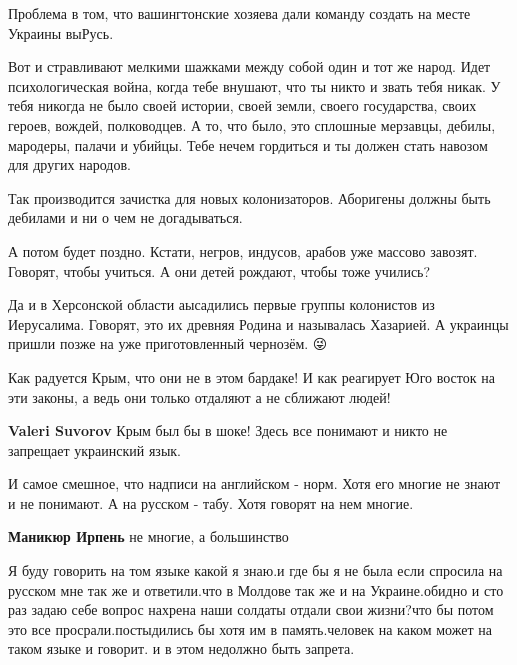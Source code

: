 \begin{itemize}
Проблема в том, что вашингтонские хозяева дали команду создать на месте Украины выРусь.

Вот и стравливают мелкими шажками между собой один и тот же народ. Идет
психологическая война, когда тебе внушают, что ты никто и звать тебя никак. У
тебя никогда не было своей истории, своей земли, своего государства, своих
героев, вождей, полководцев. А то, что было, это сплошные мерзавцы, дебилы,
мародеры, палачи и убийцы. Тебе нечем гордиться и ты должен стать навозом для
других народов.

Так производится зачистка для новых колонизаторов. Аборигены должны быть
дебилами и ни о чем не догадываться.

А потом будет поздно. Кстати, негров, индусов, арабов уже массово завозят.
Говорят, чтобы учиться. А они детей рождают, чтобы тоже учились?

Да и в Херсонской области аысадились первые группы колонистов из Иерусалима.
Говорят, это их древняя Родина и называлась Хазарией. А украинцы пришли позже
на уже приготовленный чернозём. 😜


Как радуется Крым, что они не в этом бардаке! И как реагирует Юго восток на эти
законы, а ведь они только отдаляют а не сближают людей!


\textbf{Valeri Suvorov} Крым был бы в шоке! Здесь все понимают и никто не
запрещает украинский язык.


И самое смешное, что надписи на английском - норм. Хотя его многие не знают и
не понимают. А на русском - табу. Хотя говорят на нем многие.

\textbf{Маникюр Ирпень} не многие, а большинство


Я буду говорить на том языке какой я знаю.и где бы я не была если спросила на
русском мне так же и ответили.что в Молдове так же и на Украине.обидно и сто
раз задаю себе вопрос нахрена наши солдаты отдали свои жизни?что бы потом это
все просрали.постыдились бы хотя им в память.человек на каком может на таком
языке и говорит. и в этом недолжно быть запрета.


\end{itemize}
